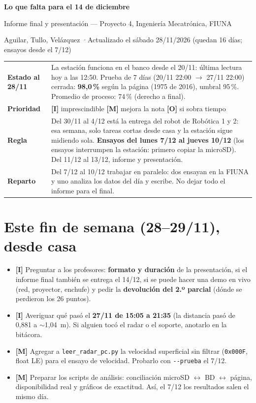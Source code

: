 \documentclass[11pt,a4paper]{article}
\newcommand{\imp}{\textcolor{rojo}{\textbf{[I]}}}
\newcommand{\mej}{\textcolor{ambar}{\textbf{[M]}}}
\newcommand{\opc}{\textcolor{gris}{\textbf{[O]}}}
\begin{document}
{\LARGE\bfseries Lo que falta para el 14 de diciembre}\par
\vspace{2pt}
{\large Informe final y presentación --- Proyecto 4, Ingeniería Mecatrónica, FIUNA}\par
\vspace{2pt}
{\small Aguilar, Tullo, Velázquez \quad·\quad Actualizado el sábado 28/11/2026 (quedan 16 días; ensayos desde el 7/12)}

\vspace{8pt}
\begin{tabularx}{\textwidth}{@{}lX@{}}
\toprule
\textbf{Estado al 28/11} & La estación funciona en el banco desde el 20/11: última lectura hoy a las 12:50.
Prueba de 7 días (20/11 22:00 $\to$ 27/11 22:00) cerrada: \textbf{98,0\,\%} según la página
(1975 de 2016), umbral 95\,\%. Promedio de proceso: 74\,\% (derecho a final). \\
\textbf{Prioridad} & \imp{} imprescindible \quad \mej{} mejora la nota \quad \opc{} si sobra tiempo \\
\textbf{Regla} & Del 30/11 al 4/12 está la entrega del robot de Robótica 1 y 2: esa semana, solo
tareas cortas desde casa y la estación sigue midiendo sola. \textbf{Ensayos del lunes 7/12 al jueves
10/12} (los ensayos interrumpen la estación: primero copiar la microSD). Del 11/12 al 13/12, informe
y presentación. \\
\textbf{Reparto} & Del 7/12 al 10/12 trabajar en paralelo: dos ensayan en la FIUNA y uno analiza los
datos del día y escribe. No dejar todo el informe para el final. \\
\bottomrule
\end{tabularx}

\section{Este fin de semana (28--29/11), desde casa}

\begin{itemize}
  \item \imp{} Preguntar a los profesores: \textbf{formato y duración} de la presentación, si el
        informe final también se entrega el 14/12, si se puede hacer una demo en vivo (red, proyector,
        enchufe) y pedir la \textbf{devolución del 2.º parcial} (dónde se perdieron los 26 puntos).
  \item \imp{} Averiguar qué pasó el \textbf{27/11 de 15:05 a 21:35} (la distancia pasó de 0,881 a
        $\sim$1,04~m). Si alguien tocó el radar o el soporte, anotarlo en la bitácora.
  \item \mej{} Agregar a \texttt{leer\_radar\_pc.py} la velocidad superficial sin filtrar
        (\texttt{0x000F}, float LE) para el ensayo de velocidad. Probarlo con \texttt{-{}-prueba}
        el 7/12.
  \item \mej{} Preparar los scripts de análisis: conciliación microSD $\leftrightarrow$ BD
        $\leftrightarrow$ página, disponibilidad real y gráficos de exactitud. Así, el 7/12 los
        resultados salen el mismo día.
\end{itemize}
\end{document}
